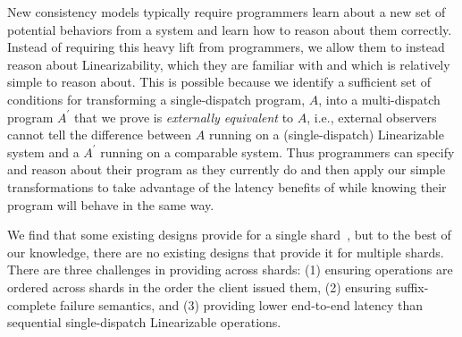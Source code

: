 
New consistency models typically require programmers learn about a new set of potential behaviors from a system and learn how to reason about them correctly.
Instead of requiring this heavy lift from programmers, we allow them to instead reason about Linearizability, which they are familiar with and which is relatively simple to reason about.
This is possible because we identify a sufficient set of conditions for transforming a single-dispatch program, $A$, into a multi-dispatch program $A^\prime$ that we prove is \textit{externally equivalent} to $A$, i.e., external observers cannot tell the difference between $A$ running on a (single-dispatch) Linearizable system and a $A^\prime$ running on a
comparable \mdl{} system.
Thus programmers can specify and reason about their program as they currently do and then apply our simple transformations to take advantage of the latency benefits of \mdl{} while knowing their program will behave in the same way.


We find that some existing designs provide \mdllong{} for a single shard~\cite{ongaro2014consensus}, but to the best of our knowledge, there are no existing designs that provide it for multiple shards.
There are three challenges in providing \mdl{} across shards:
(1) ensuring operations are ordered across shards in the order the client issued them,
(2) ensuring suffix-complete failure semantics,
and
(3) providing lower end-to-end latency than sequential single-dispatch Linearizable operations.

